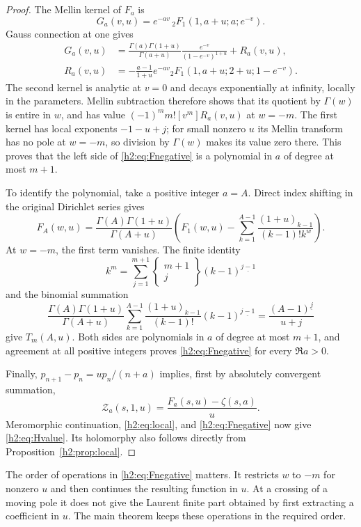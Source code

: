 \begin{proof}
The Mellin kernel of $F_a$ is
\[
 G_a(v,u)=e^{-av}\,{}_2F_1(1,a+u;a;e^{-v}).
\]
Gauss connection at one gives
\begin{align*}
 G_a(v,u)&=\frac{\Gamma(a)\Gamma(1+u)}{\Gamma(a+u)}
       \frac{e^{-v}}{(1-e^{-v})^{1+u}}+R_a(v,u),\\
 R_a(v,u)&=-\frac{a-1}{1+u}e^{-av}
      {}_2F_1(1,a+u;2+u;1-e^{-v}).
\end{align*}
The second kernel is analytic at $v=0$ and decays exponentially at
infinity, locally in the parameters. Mellin subtraction therefore
shows that its quotient by $\Gamma(w)$ is entire in $w$, and has value
$(-1)^m m![v^m]R_a(v,u)$ at $w=-m$. The first kernel has local
exponents $-1-u+j$; for small nonzero $u$ its Mellin transform has no
pole at $w=-m$, so division by $\Gamma(w)$ makes its value zero there.
This proves that the left side of \eqref{h2:eq:Fnegative} is a
polynomial in $a$ of degree at most $m+1$.

To identify the polynomial, take a positive integer $a=A$. Direct
index shifting in the original Dirichlet series gives
\[
 F_A(w,u)=\frac{\Gamma(A)\Gamma(1+u)}{\Gamma(A+u)}
 \left(F_1(w,u)-\sum_{k=1}^{A-1}
       \frac{(1+u)_{k-1}}{(k-1)!k^w}\right).
\]
At $w=-m$, the first term vanishes. The finite identity
\[
 k^m=\sum_{j=1}^{m+1}
    \left\{\begin{matrix}m+1\\j\end{matrix}\right\}
                           (k-1)^{\underline{j-1}}
\]
and the binomial summation
\[
 \frac{\Gamma(A)\Gamma(1+u)}{\Gamma(A+u)}
 \sum_{k=1}^{A-1}\frac{(1+u)_{k-1}}{(k-1)!}
           (k-1)^{\underline{j-1}}
       =\frac{(A-1)^{\underline j}}{u+j}
\]
give $T_m(A,u)$. Both sides are polynomials in $a$ of degree at most
$m+1$, and agreement at all positive integers proves
\eqref{h2:eq:Fnegative} for every $\Re a>0$.

Finally, $p_{n+1}-p_n=up_n/(n+a)$ implies, first by absolutely
convergent summation,
\begin{equation}\label{h2:eq:telescoping}
 \mathcal Z_a(s,1,u)=\frac{F_a(s,u)-\zeta(s,a)}u.
\end{equation}
Meromorphic continuation, \eqref{h2:eq:local}, and
\eqref{h2:eq:Fnegative} now give \eqref{h2:eq:Hvalue}. Its
holomorphy also follows directly from Proposition~\ref{h2:prop:local}.
\end{proof}

The order of operations in \eqref{h2:eq:Fnegative} matters. It restricts
$w$ to $-m$ for nonzero $u$ and then continues the resulting function in
$u$. At a crossing of a moving pole it does not give the Laurent finite
part obtained by first extracting a coefficient in $u$. The main
theorem keeps these operations in the required order.

